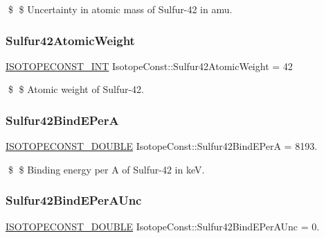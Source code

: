 \$ \$ Uncertainty in atomic mass of Sulfur-\/42 in amu. \mbox{\label{group___isotope_const-_sulfur-_s42_gaf565f6e05edec8cb38673b15e2550c36}} 
\subsubsection{\texorpdfstring{Sulfur42\+Atomic\+Weight}{Sulfur42AtomicWeight}}
{\footnotesize\ttfamily \mbox{\hyperlink{group___isotope_const-_macros_ga5f18360b3e99483a35c32d789e62621c}{I\+S\+O\+T\+O\+P\+E\+C\+O\+N\+S\+T\+\_\+\+I\+NT}} Isotope\+Const\+::\+Sulfur42\+Atomic\+Weight = 42}

\$ \$ Atomic weight of Sulfur-\/42. \mbox{\label{group___isotope_const-_sulfur-_s42_gad1da047158b4a56fbb4eca7e886fed0d}} 
\subsubsection{\texorpdfstring{Sulfur42\+Bind\+E\+PerA}{Sulfur42BindEPerA}}
{\footnotesize\ttfamily \mbox{\hyperlink{group___isotope_const-_macros_ga8f45a7272ce02c0b4c65c44636ed719a}{I\+S\+O\+T\+O\+P\+E\+C\+O\+N\+S\+T\+\_\+\+D\+O\+U\+B\+LE}} Isotope\+Const\+::\+Sulfur42\+Bind\+E\+PerA = 8193.}

\$ \$ Binding energy per A of Sulfur-\/42 in keV. \mbox{\label{group___isotope_const-_sulfur-_s42_ga250449377f39072bf1a6a9a064ed2bf6}} 
\subsubsection{\texorpdfstring{Sulfur42\+Bind\+E\+Per\+A\+Unc}{Sulfur42BindEPerAUnc}}
{\footnotesize\ttfamily \mbox{\hyperlink{group___isotope_const-_macros_ga8f45a7272ce02c0b4c65c44636ed719a}{I\+S\+O\+T\+O\+P\+E\+C\+O\+N\+S\+T\+\_\+\+D\+O\+U\+B\+LE}} Isotope\+Const\+::\+Sulfur42\+Bind\+E\+Per\+A\+Unc = 0.}

